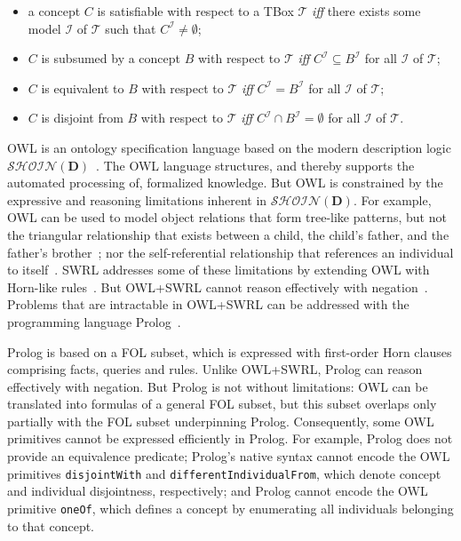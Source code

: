 \begin{itemize}

\item a concept $C$ is satisfiable with respect to a TBox $\mathcal{T}$ \emph{iff} there exists some model $\mathcal{I}$ of $\mathcal{T}$ such that $C^\mathcal{I} \not= \emptyset$;

\item $C$ is subsumed by a concept $B$ with respect to $\mathcal{T}$ \emph{iff} $C^\mathcal{I} \subseteq B^\mathcal{I}$ for all $\mathcal{I}$ of $\mathcal{T}$;

\item $C$ is equivalent to $B$ with respect to $\mathcal{T}$ \emph{iff} $C^\mathcal{I} = B^\mathcal{I}$ for all $\mathcal{I}$ of $\mathcal{T}$;

\item $C$ is disjoint from $B$ with respect to $\mathcal{T}$ \emph{iff} $C^\mathcal{I} \cap B^\mathcal{I} = \emptyset$ for all $\mathcal{I}$ of $\mathcal{T}$.

\end{itemize}

OWL is an ontology specification language based on the modern description logic $\mathcal{SHOIN(\mathbf{D})}$~\cite{Horrocks_2011}. The OWL language structures, and thereby supports the automated processing of, formalized knowledge. But OWL is constrained by the expressive and reasoning limitations inherent in $\mathcal{SHOIN(\mathbf{D})}$. For example, OWL can be used to model object relations that form tree-like patterns, but not the triangular relationship that exists between a child, the child's father, and the father's brother~\cite{Motik_2006}; nor the self-referential relationship that references an individual to itself~\cite{Krotzsch_2011}. SWRL addresses some of these limitations by extending OWL with Horn-like rules~\cite{Horrocks_2004}. But OWL+SWRL cannot reason effectively with negation~\cite{Motik_2006,McGrath_2008}. Problems that are intractable in OWL+SWRL can be addressed with the programming language Prolog~\cite{Motik_2006,Volz_2003}.

Prolog is based on a FOL subset, which is expressed with first-order Horn clauses comprising facts, queries and rules. Unlike OWL+SWRL, Prolog can reason effectively with negation. But Prolog is not without limitations: OWL can be translated into formulas of a general FOL subset, but this subset overlaps only partially with the FOL subset underpinning Prolog. Consequently, some OWL primitives cannot be expressed efficiently in Prolog. For example, Prolog does not provide an equivalence predicate; Prolog's native syntax cannot encode the OWL primitives \texttt{disjointWith} and \texttt{differentIndividualFrom}, which denote concept and individual disjointness, respectively; and Prolog cannot encode the OWL primitive \texttt{oneOf}, which defines a concept by enumerating all individuals belonging to that concept.

